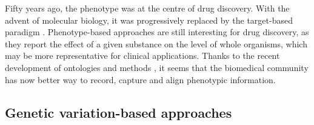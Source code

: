 Fifty years ago, the phenotype was at the centre of drug discovery. With the advent of molecular biology, it was progressively replaced by the target-based paradigm \citep{duran2012recycling}. Phenotype-based approaches are still interesting for drug discovery, as they report the effect of a given substance on the level of whole organisms, which may be more representative for clinical applications. Thanks to the recent development of ontologies and methods \citep{hoehndorf2007representing} \citep{hoehndorf2011phenomenet}, it seems that the biomedical community has now better way to record, capture and align phenotypic information.

\subsection{Genetic variation-based approaches}

